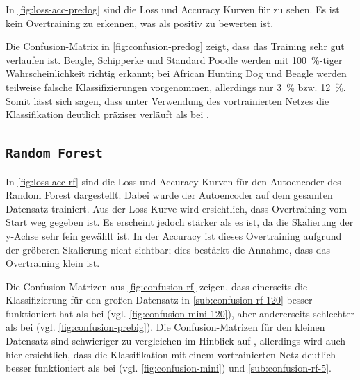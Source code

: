 In \autoref{fig:loss-acc-predog} sind die Loss und Accuracy Kurven für \PreDog{} zu sehen.
Es ist kein Overtraining zu erkennen, was als positiv zu bewerten ist.

Die Confusion-Matrix in \autoref{fig:confusion-predog} zeigt, dass das Training sehr gut
verlaufen ist. Beagle, Schipperke und Standard Poodle werden mit \SI{100}{\percent}-tiger
Wahrscheinlichkeit richtig erkannt; bei African Hunting Dog und Beagle werden teilweise
falsche Klassifizierungen vorgenommen, allerdings nur \SI{3}{\percent} bzw.
\SI{12}{\percent}. Somit lässt sich sagen, dass unter Verwendung des vortrainierten
Netzes die Klassifikation deutlich präziser verläuft als bei \MiniDog{}.


\subsection{\texttt{Random Forest}}


In \autoref{fig:loss-acc-rf} sind die Loss und Accuracy Kurven für den
Autoencoder des Random Forest dargestellt. Dabei wurde der Autoencoder auf dem
gesamten Datensatz trainiert. Aus der Loss-Kurve wird ersichtlich, dass
Overtraining vom Start weg gegeben ist. Es erscheint jedoch stärker als es ist,
da die Skalierung der y-Achse sehr fein gewählt ist. In der Accuracy ist dieses
Overtraining aufgrund der gröberen Skalierung nicht sichtbar; dies bestärkt die
Annahme, dass das Overtraining klein ist.

Die Confusion-Matrizen aus \autoref{fig:confusion-rf} zeigen, dass einerseits
die Klassifizierung für den großen Datensatz in \autoref{sub:confusion-rf-120} besser funktioniert hat
als bei \MiniDog{} (vgl. \autoref{fig:confusion-mini-120}), aber andererseits schlechter als bei
\PreBig{} (vgl. \autoref{fig:confusion-prebig}). Die Confusion-Matrizen für den kleinen Datensatz
sind schwieriger zu vergleichen im Hinblick auf \MiniDog{}, allerdings wird auch
hier ersichtlich, dass die Klassifikation mit einem vortrainierten Netz deutlich
besser funktioniert als bei \MiniDog{} (vgl. \autoref{fig:confusion-mini}) und
\autoref{sub:confusion-rf-5}.

